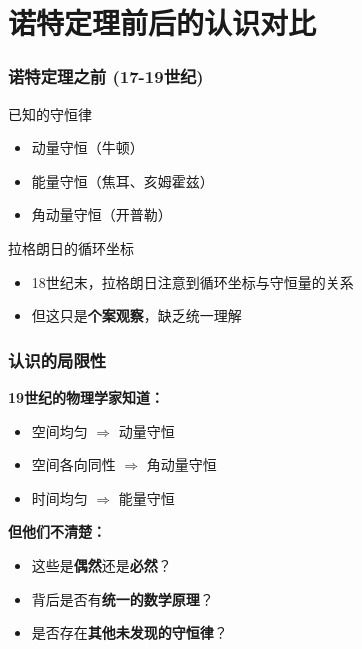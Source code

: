 \documentclass[xcolor=dvipsnames]{ctexbeamer}
\begin{document}
\section{诺特定理前后的认识对比}

\begin{frame}
\frametitle{诺特定理之前 (17-19世纪)}
\begin{block}{已知的守恒律}
\begin{itemize}
\item 动量守恒（牛顿）
\item 能量守恒（焦耳、亥姆霍兹）
\item 角动量守恒（开普勒）
\end{itemize}
\end{block}

\pause

\begin{block}{拉格朗日的循环坐标}
\begin{itemize}
\item 18世纪末，拉格朗日注意到循环坐标与守恒量的关系
\item 但这只是\textbf{个案观察}，缺乏统一理解
\end{itemize}
\end{block}
\end{frame}

\begin{frame}
\frametitle{认识的局限性}
\textbf{19世纪的物理学家知道：}
\begin{itemize}
\item 空间均匀 $\Rightarrow$ 动量守恒
\item 空间各向同性 $\Rightarrow$ 角动量守恒
\item 时间均匀 $\Rightarrow$ 能量守恒
\end{itemize}

\pause

\vspace{1em}
\textbf{但他们不清楚：}
\begin{itemize}
\item 这些是\textbf{偶然}还是\textbf{必然}？
\item 背后是否有\textbf{统一的数学原理}？
\item 是否存在\textbf{其他未发现的守恒律}？
\end{itemize}
\end{frame}
\end{document}
